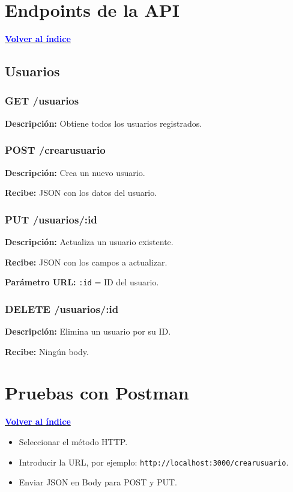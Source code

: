 \documentclass[12pt,a4paper]{article}
\newcommand{\volverindice}{\noindent\hyperlink{toc}{\textcolor{blue}{\textbf{Volver al índice}}}\par\vspace{0.5cm}}
\begin{document}
\section{Endpoints de la API}
\volverindice

\subsection{Usuarios}

\subsubsection*{GET /usuarios}
\textbf{Descripción:} Obtiene todos los usuarios registrados.



\subsubsection*{POST /crearusuario}
\textbf{Descripción:} Crea un nuevo usuario.

\textbf{Recibe:} JSON con los datos del usuario.



\subsubsection*{PUT /usuarios/:id}
\textbf{Descripción:} Actualiza un usuario existente.

\textbf{Recibe:} JSON con los campos a actualizar.

\textbf{Parámetro URL:} \texttt{:id} = ID del usuario.

\subsubsection*{DELETE /usuarios/:id}
\textbf{Descripción:} Elimina un usuario por su ID.

\textbf{Recibe:} Ningún body.

\section{Pruebas con Postman}
\volverindice

\begin{itemize}
    \item Seleccionar el método HTTP.
    \item Introducir la URL, por ejemplo: \texttt{http://localhost:3000/crearusuario}.
    \item Enviar JSON en Body para POST y PUT.
\end{itemize}
\end{document}
